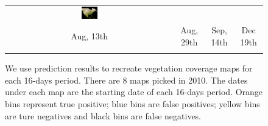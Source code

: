 \begin{figure}
\begin{center}
\begin{tabular}{cccc}
\includegraphics[width=0.10\textwidth]{map/91.png}  \\
Aug, 13th&Aug, 29th&Sep, 14th&Dec 19th\\
\\
\end{tabular}
\end{center}
\vspace{-24pt}
\caption{%
We use prediction results to recreate vegetation coverage maps for each 16-days period. There are 8 maps picked in 2010. The dates under each map are the starting date of each 16-days period.
Orange bins represent true positive; blue bins are false positives; yellow bins are ture negatives and black bins are false negatives. }
\label{fig:map}
\vspace{-12pt}
\end{figure}
%
%
%
%
%
